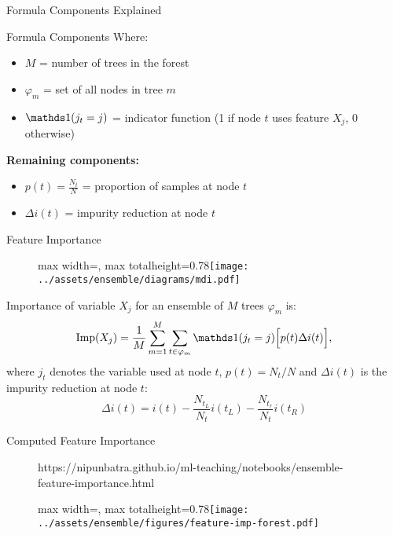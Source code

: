 \documentclass[10pt]{beamer}
\newcommand{\fitpic}[1]{\begin{adjustbox}{max width=\linewidth, max totalheight=0.78\textheight}#1\end{adjustbox}}
\begin{document}
\begin{frame}{Formula Components Explained}
\begin{keypointsbox}{Formula Components}
Where:
\begin{itemize}
\item $M$ = number of trees in the forest
\item $\varphi_m$ = set of all nodes in tree $m$
\item $\indicator(j_t = j)$ = indicator function (1 if node $t$ uses feature $X_j$, 0 otherwise)
\end{itemize}
\end{keypointsbox}

\begin{examplebox}
\textbf{Remaining components:}
\begin{itemize}
\item $p(t) = \frac{N_t}{N}$ = proportion of samples at node $t$
\item $\Delta i(t)$ = impurity reduction at node $t$
\end{itemize}
\end{examplebox}
\end{frame}

\begin{frame}{Feature Importance\footnotemark}
  \begin{figure}
    \fitpic{\texttt{[image: ../assets/ensemble/diagrams/mdi.pdf]}}
  \end{figure}
  Importance of variable $X_j$ for an ensemble of $M$ trees $\varphi_{m}$ is:
  \begin{equation*}
    \text{Imp}(X_j) = \frac{1}{M} \sum_{m=1}^M \sum_{t \in \varphi_{m}} \indicator(j_t = j) \Big[ p(t) \Delta i(t) \Big],
  \end{equation*}
  where $j_t$ denotes the variable used at node $t$, $p(t)=N_t/N$ and $\Delta i(t)$ is the impurity reduction at node $t$:
  \begin{equation*}
    \Delta i(t) = i(t) - \frac{N_{t_L}}{N_t} i(t_L) - \frac{N_{t_r}}{N_t} i(t_R)
  \end{equation*}

\end{frame}


\begin{frame}{Computed Feature Importance}
  \begin{figure}[htp]
    \centering
    \begin{notebookbox}{https://nipunbatra.github.io/ml-teaching/notebooks/ensemble-feature-importance.html}
      \fitpic{\texttt{[image: ../assets/ensemble/figures/feature-imp-forest.pdf]}}
    \end{notebookbox}
\end{figure}
\end{frame}
\end{document}
